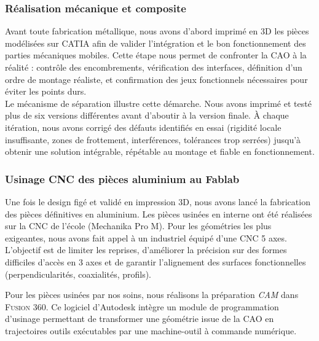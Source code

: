 \newpage
\subsubsection{Réalisation mécanique et composite}

Avant toute fabrication métallique, nous avons d’abord imprimé en 3D les pièces modélisées sur \textsc{\acrshort{CATIA}} afin de
valider l’intégration et le bon fonctionnement des parties mécaniques mobiles. Cette étape nous permet de confronter la
\acrshort{CAO} à la réalité : contrôle des encombrements, vérification des interfaces, définition d’un ordre de montage
réaliste, et confirmation des jeux fonctionnels nécessaires pour éviter les points durs.\\

Le mécanisme de séparation illustre cette démarche. Nous avons imprimé et testé plus de six versions différentes avant d’aboutir
à la version finale. À chaque itération, nous avons corrigé des défauts identifiés en essai (rigidité locale insuffisante, zones
de frottement, interférences, tolérances trop serrées) jusqu’à obtenir une solution intégrable, répétable au montage et fiable en
fonctionnement.

\subsubsection{Usinage \acrshort{CNC} des pièces aluminium au Fablab}

Une fois le design figé et validé en impression 3D, nous avons lancé la fabrication des pièces définitives en aluminium. Les
pièces usinées en interne ont été réalisées sur la \acrshort{CNC} de l’école (Mechanika Pro M). Pour les géométries les plus
exigeantes, nous avons fait appel à un industriel équipé d’une \acrshort{CNC} 5 axes. L’objectif est de limiter les reprises,
d’améliorer la précision sur des formes difficiles d’accès en 3 axes et de garantir l’alignement des surfaces fonctionnelles
(perpendicularités, coaxialités, profils).

Pour les pièces usinées par nos soins, nous réalisons la préparation \textit{\acrfull{CAM}} dans \textsc{Fusion 360}. Ce logiciel
d’Autodesk intègre un module de programmation d’usinage permettant de transformer une géométrie issue de la CAO en trajectoires
outils exécutables par une machine-outil à commande numérique.\\

